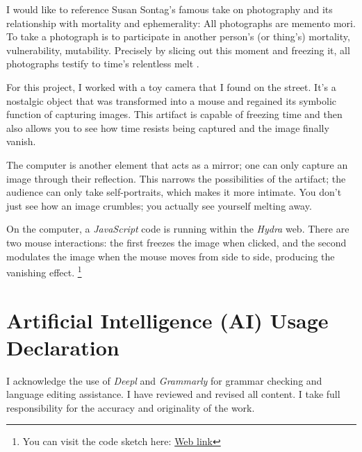 \documentclass[12pt, twoside, a4paper]{report}
\begin{document}
I would like to reference Susan Sontag's famous take on photography and its relationship with mortality and ephemerality: All photographs are memento mori. To take a photograph is to participate in another person’s (or thing’s) mortality, vulnerability, mutability. Precisely by slicing out this moment and freezing it, all photographs testify to time’s relentless melt \citep{sontag2021photography}.

For this project, I worked with a toy camera that I found on the street. It's a nostalgic object that was transformed into a mouse and regained its symbolic function of capturing images. This artifact is capable of freezing time and then also allows you to see how time resists being captured and the image finally vanish.

The computer is another element that acts as a mirror; one can only capture an image through their reflection. This narrows the possibilities of the artifact; the audience can only take self-portraits, which makes it more intimate. You don't just see how an image crumbles; you actually see yourself melting away.

On the computer, a \textit{JavaScript} code is running within the \textit{Hydra} web. There are two mouse interactions: the first freezes the image when clicked, and the second modulates the image when the mouse moves from side to side, producing the vanishing effect.
\footnote{You can visit the code sketch here: \href{https://hydra.ojack.xyz/?sketch_id=WhNSNFruQ8Uy11d8}{Web link} }

\section{Artificial Intelligence (AI) Usage Declaration}

I acknowledge the use of \textit{Deepl} and \textit{Grammarly} for grammar checking and language editing assistance.  I have reviewed and revised all content. I take full responsibility for the accuracy and originality of the work.

\newpage



\end{document}
